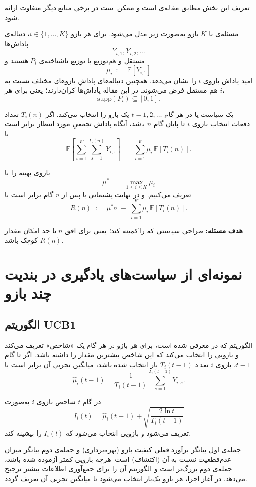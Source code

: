 \documentclass[a4paper,10pt,twocolumn]{article}
\begin{document}
\noindent
تعریف این بخش مطابق مقاله‌ی  است \cite{auer2002finite} و ممکن است در برخی منابع دیگر متفاوت ارائه شود.

\medskip

مسئله‌ی  با $K$ بازو به‌صورت زیر مدل می‌شود.
برای هر بازو $i\in\{1,\dots,K\}$، دنباله‌ی پاداش‌ها
\[
Y_{i,1},Y_{i,2},\dots
\]
مستقل و هم‌توزیع با توزیع ناشناخته‌ی $P_i$ هستند و
\[
\mu_i \;:=\; \mathbb{E}[Y_{i,1}]
\]
امید پاداش بازوی $i$ را نشان می‌دهد.
همچنین دنباله‌های پاداشِ بازوهای مختلف نسبت به هم مستقل فرض می‌شوند.
در این مقاله پاداش‌ها کران‌دارند؛ یعنی برای هر $i$،
\[
\mathrm{supp}(P_i)\subseteq [0,1].
\]

یک سیاست یا  در هر گام $t=1,2,\dots$ یک بازو را انتخاب می‌کند.
اگر $T_i(n)$ تعداد دفعات انتخاب بازوی $i$ تا پایان گام $n$ باشد، آنگاه پاداش تجمعیِ مورد انتظار برابر است با
\[
\mathbb{E}\!\left[\sum_{i=1}^K \sum_{s=1}^{T_i(n)} Y_{i,s}\right]
\;=\;
\sum_{i=1}^K \mu_i\,\mathbb{E}[T_i(n)].
\]

بازوی بهینه را با
\[
\mu^\ast \;:=\; \max_{1\le i\le K}\mu_i
\]
تعریف می‌کنیم. و در نهایت پشیمانی یا  پس از $n$ گام برابر است با
\[
R(n)
\;:=\;
\mu^\ast n \;-\; \sum_{i=1}^K \mu_i\,\mathbb{E}[T_i(n)].
\]

\noindent
\textbf{هدف مسئله:} طراحی سیاستی که  را \emph{کمینه} کند؛ یعنی برای افق $n$ تا حد امکان مقدار $R(n)$ کوچک باشد.


\section{نمونه‌ای از سیاست‌های یادگیری در بندیت چند بازو}

\subsection{الگوریتم UCB1}

الگوریتم  که در \cite{auer2002finite} معرفی شده است،
برای هر بازو در هر گام یک «شاخص» تعریف می‌کند و بازویی را انتخاب می‌کند
که این شاخص بیشترین مقدار را داشته باشد.
اگر تا گام $t-1$، بازوی $i$ تعداد $T_i(t-1)$ بار انتخاب شده باشد،
میانگین تجربی آن برابر است با
\[
\widehat{\mu}_i(t-1)
=
\frac{1}{T_i(t-1)}
\sum_{s=1}^{T_i(t-1)} Y_{i,s}.
\]

در گام $t$ شاخص بازوی $i$ به‌صورت
\[
I_i(t)
=
\widehat{\mu}_i(t-1)
+
\sqrt{\frac{2\ln t}{T_i(t-1)}}
\]
تعریف می‌شود و بازویی انتخاب می‌شود که $I_i(t)$ را بیشینه کند.

جمله‌ی اول بیانگر برآورد فعلی کیفیت بازو (بهره‌برداری) و
جمله‌ی دوم بیانگر میزان عدم‌قطعیت نسبت به آن (اکتشاف) است.
هرچه بازویی کمتر آزموده شده باشد، جمله‌ی دوم بزرگ‌تر است و
الگوریتم آن را برای جمع‌آوری اطلاعات بیشتر ترجیح می‌دهد.
در آغاز اجرا، هر بازو یک‌بار انتخاب می‌شود تا میانگین تجربی آن تعریف گردد.
\end{document}
